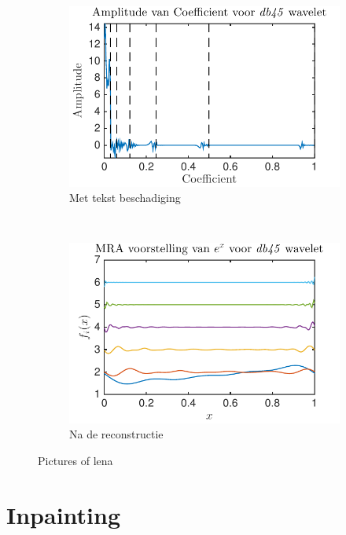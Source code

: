 \begin{figure}
\begin{subfigure}[b]{0.45\textwidth}
        \includegraphics[width=\textwidth]{../src/denoising/db45_noNoise/coef_exp_db45_5}
        \caption{Met tekst beschadiging}
        \label{fig:tiger}
    \end{subfigure}
    ~ %
    \begin{subfigure}[b]{0.45\textwidth}
        \includegraphics[width=\textwidth]{../src/denoising/db45_noNoise/MRA_exp_db45_5}
        \caption{Na de reconstructie}
        \label{fig:mouse}
    \end{subfigure}

    \caption{Pictures of lena}\label{fig:animals}
\end{figure}



\section{Inpainting}

